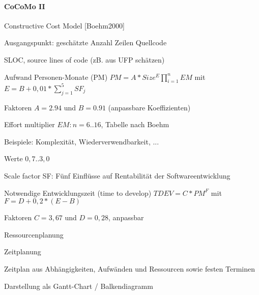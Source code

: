 \documentclass[a4paper]{article}
\begin{document}
\begin{multicols}{3}
  \paragraph{CoCoMo II}
  \begin{itemize*}
    \item Constructive Cost Model [Boehm2000]
    \item Ausgangspunkt: geschätzte Anzahl Zeilen Quellcode
          \begin{itemize*}
            \item SLOC, source lines of code (zB. aus UFP schätzen)
          \end{itemize*}
    \item Aufwand Personen-Monate (PM) $PM = A * Size^E \prod_{i=1}^n EM$ mit $E=B+0,01*\sum_{j=1}^5 SF_j$
    \item Faktoren $A=2.94$ und $B=0.91$ (anpassbare Koeffizienten)
    \item Effort multiplier $EM: n=6..16$, Tabelle nach Boehm
          \begin{itemize*}
            \item Beispiele: Komplexität, Wiederverwendbarkeit, ...
            \item Werte $0,7 .. 3,0$
          \end{itemize*}
    \item Scale factor SF: Fünf Einflüsse auf Rentabilität der Softwareentwicklung
    \item Notwendige Entwicklungszeit (time to develop) $TDEV = C * PM^F$ mit $F = D + 0,2 * ( E - B )$
    \item Faktoren $C=3,67$ und $D=0,28$, anpassbar
    \item Ressourcenplanung %
    \item Zeitplanung
          \begin{itemize*}
            \item Zeitplan aus Abhängigkeiten, Aufwänden und Ressourcen sowie festen Terminen
            \item Darstellung als Gantt-Chart / Balkendiagramm
          \end{itemize*}
  \end{itemize*}


\end{multicols}
\end{document}
